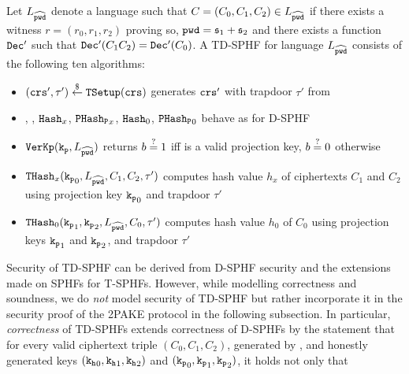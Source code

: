 \begin{definition}[TD-SPHF]\label{def:tdsphf}
Let $L_{\widehat{\mathtt{pwd}}}$ denote a language such that $C=(C_0,C_1,C_2)\in L_{\widehat{\mathtt{pwd}}}$ if there exists a witness $r=(r_0,r_1,r_2)$ proving so, $\mathtt{pwd}=\mathfrak{s}_1+\mathfrak{s}_2$ and there exists a function $\mathtt{Dec}'$ such that $\mathtt{Dec}'(C_1 C_2)=\mathtt{Dec}'(C_0)$.
A \ac{TD-SPHF} for language $L_{\widehat{\mathtt{pwd}}}$ consists of the following ten algorithms:

\begin{itemize}
	\item $(\mathtt{crs}',\tau')\stackrel{\$}{\gets}\mathtt{TSetup}(\mathtt{crs})$ generates $\mathtt{crs}'$ with trapdoor $\tau'$ from \crs

	\item \HKGen, \PKGen, $\mathtt{Hash}_x$, $\mathtt{PHash_P}_x$, $\mathtt{Hash}_0$, $\mathtt{PHash_P}_0$ behave as for \ac{D-SPHF}
	
	\item $\mathtt{VerKp}(\mathtt{k_p},L_{\widehat{\mathtt{pwd}}})$ returns $b\stackrel{?}{=} 1$ iff \hp is a valid projection key, $b\stackrel{?}{=} 0$ otherwise
	
	\item $\mathtt{THash}_x(\mathtt{k_p}_0,L_{\widehat{\mathtt{pwd}}},C_1,C_2,\tau')$ computes hash value $h_x$ of ciphertexts $C_1$ and $C_2$ using projection key $\mathtt{k_p}_0$ and trapdoor $\tau'$
	
	\item $\mathtt{THash}_0(\mathtt{k_p}_1,\mathtt{k_p}_2,L_{\widehat{\mathtt{pwd}}},C_0,\tau')$ computes hash value $h_0$ of $C_0$ using projection keys $\mathtt{k_p}_1$ and $\mathtt{k_p}_2$, and trapdoor $\tau'$
\end{itemize}
\end{definition}


\noindent
Security of \ac{TD-SPHF} can be derived from \ac{D-SPHF} security and the extensions made on \acp{SPHF} for \acp{T-SPHF}.
However, while modelling correctness and soundness, we do \emph{not} model security of \ac{TD-SPHF} but rather incorporate it in the security proof of the \ac{2PAKE} protocol in the following subsection.
In particular, \emph{correctness} of TD-SPHFs extends correctness of D-SPHFs by the statement that for every  valid ciphertext triple $(C_0,C_1,C_2)$, generated by \cL, and honestly generated keys $(\mathtt{k_h}_0,\mathtt{k_h}_1,\mathtt{k_h}_2)$ and $(\mathtt{k_p}_0,\mathtt{k_p}_1,\mathtt{k_p}_2)$, it holds not only that 

